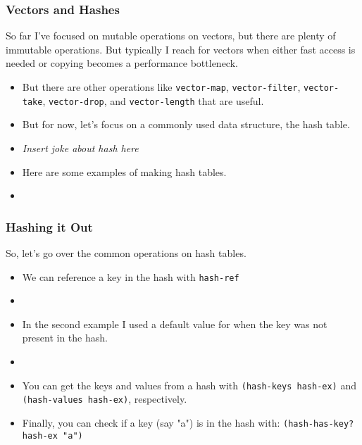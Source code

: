 \documentclass{beamer}
\begin{document}
\begin{frame}
  \frametitle{Vectors and Hashes}
  So far I've focused on mutable operations on vectors, but there are
  plenty of immutable operations. But typically I reach for vectors when
  either fast access is needed or copying becomes a performance bottleneck.
  \begin{itemize}
  \item<2-> But there are other operations like
    \texttt{vector-map}, \texttt{vector-filter},
    \texttt{vector-take}, \texttt{vector-drop},
    and \texttt{vector-length} that are useful.
  \item<3-> But for now, let's focus on a commonly used data structure,
    the hash table.
  \item<4-> \emph{Insert joke about hash here}
  \item<5-> Here are some examples of making hash tables.
  \item<6-> \makehash
  \end{itemize}
\end{frame}



\begin{frame}
  \frametitle{Hashing it Out}
  So, let's go over the common operations on hash tables.
  \begin{itemize}
  \item<2-> We can reference a key in the hash with
    \texttt{hash-ref} 
  \item<3-> \hashref
  \item<4-> In the second example I used a default value for when
    the key was not present in the hash.
  \item<5-> \hashset
  \item<6-> You can get the keys and values from a hash with
    \texttt{(hash-keys hash-ex)} and
    \texttt{(hash-values hash-ex)}, respectively.
  \item<7-> Finally, you can check if a key (say "a") is in the hash with:
    \texttt{(hash-has-key? hash-ex "a")}
  \end{itemize}
\end{frame}
\end{document}
